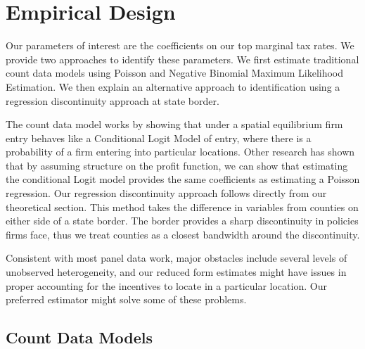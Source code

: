 \section{Empirical Design}

Our parameters of interest are the coefficients on our top marginal tax rates. We provide two approaches to identify these parameters. We first estimate traditional count data models using Poisson and Negative Binomial Maximum Likelihood Estimation. We then explain an alternative approach to identification using a regression discontinuity approach at state border.

The count data model works by showing that under a spatial equilibrium firm entry behaves like a Conditional Logit Model of entry, where there is a probability of a firm entering into particular locations. Other research has shown that by assuming structure on the profit function, we can show that estimating the conditional Logit model provides the same coefficients as estimating a Poisson regression. Our regression discontinuity approach follows directly from our theoretical section. This method takes the difference in variables from counties on either side of a state border. The border provides a sharp discontinuity in policies firms face, thus we treat counties as a closest bandwidth around the discontinuity.

Consistent with most panel data work, major obstacles include several levels of unobserved heterogeneity, and our reduced form estimates might have issues in proper accounting for the incentives to locate in a particular location. Our preferred estimator might solve some of these problems.

\subsection{Count Data Models}


